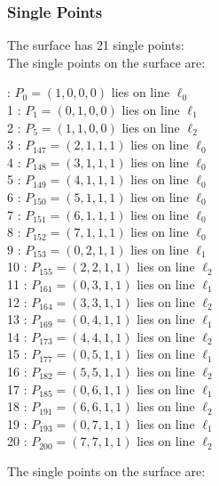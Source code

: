 \documentclass{article}
\begin{document}
{\subsubsection*{Single Points}
The surface has 21 single points:\\
The single points on the surface are:\\
\begin{multicols}{2}
 : $P_{0}=( 1, 0, 0, 0 )$ lies on line $\ell_{0}$\\
1 : $P_{1}=( 0, 1, 0, 0 )$ lies on line $\ell_{1}$\\
2 : $P_{5}=( 1, 1, 0, 0 )$ lies on line $\ell_{2}$\\
3 : $P_{147}=( 2, 1, 1, 1 )$ lies on line $\ell_{0}$\\
4 : $P_{148}=( 3, 1, 1, 1 )$ lies on line $\ell_{0}$\\
5 : $P_{149}=( 4, 1, 1, 1 )$ lies on line $\ell_{0}$\\
6 : $P_{150}=( 5, 1, 1, 1 )$ lies on line $\ell_{0}$\\
7 : $P_{151}=( 6, 1, 1, 1 )$ lies on line $\ell_{0}$\\
8 : $P_{152}=( 7, 1, 1, 1 )$ lies on line $\ell_{0}$\\
9 : $P_{153}=( 0, 2, 1, 1 )$ lies on line $\ell_{1}$\\
10 : $P_{155}=( 2, 2, 1, 1 )$ lies on line $\ell_{2}$\\
11 : $P_{161}=( 0, 3, 1, 1 )$ lies on line $\ell_{1}$\\
12 : $P_{164}=( 3, 3, 1, 1 )$ lies on line $\ell_{2}$\\
13 : $P_{169}=( 0, 4, 1, 1 )$ lies on line $\ell_{1}$\\
14 : $P_{173}=( 4, 4, 1, 1 )$ lies on line $\ell_{2}$\\
15 : $P_{177}=( 0, 5, 1, 1 )$ lies on line $\ell_{1}$\\
16 : $P_{182}=( 5, 5, 1, 1 )$ lies on line $\ell_{2}$\\
17 : $P_{185}=( 0, 6, 1, 1 )$ lies on line $\ell_{1}$\\
18 : $P_{191}=( 6, 6, 1, 1 )$ lies on line $\ell_{2}$\\
19 : $P_{193}=( 0, 7, 1, 1 )$ lies on line $\ell_{1}$\\
20 : $P_{200}=( 7, 7, 1, 1 )$ lies on line $\ell_{2}$\\
\end{multicols}
The single points on the surface are:\\
}
\end{document}
